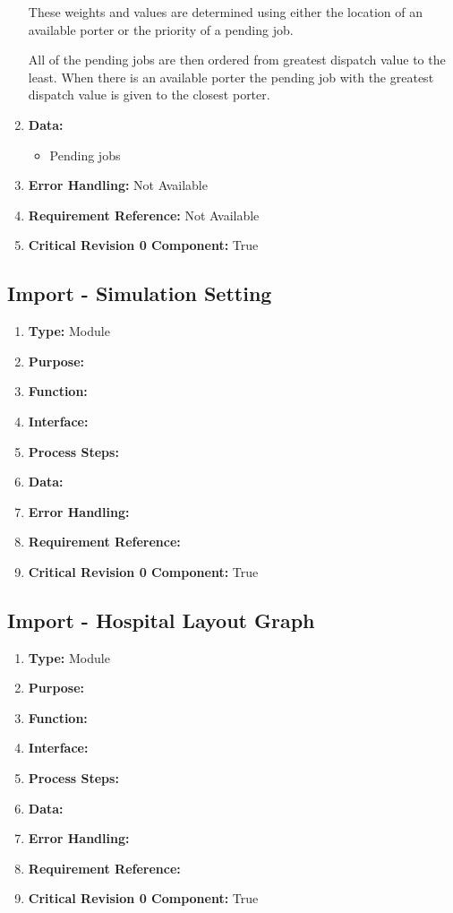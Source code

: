 \documentclass[paper=letter, fontsize=10pt]{scrartcl}
\numberwithin{equation}{section}		%
\numberwithin{figure}{section}			%
\numberwithin{table}{section}				%
\begin{document}
\begin{enumerate}[]
	These weights and values are determined using either the location of an available porter or the priority of a pending job.
	
	All of the pending jobs are then ordered from greatest dispatch value to the least.  When there is an available porter the pending job with the greatest dispatch value is given to the closest porter.
	\item \textbf{Data:}
		\begin{itemize}
			\item Pending jobs
		\end{itemize}
	\item \textbf{Error Handling:} Not Available
	\item \textbf{Requirement Reference:} Not Available
	\item \textbf{Critical Revision 0 Component:} True
\end{enumerate}
\subsection{Import - Simulation Setting}
\begin{enumerate}[]
	\item \textbf{Type:} Module
	\item \textbf{Purpose:} 
	\item \textbf{Function:} 
	\item \textbf{Interface:}
	\item \textbf{Process Steps:} 
	\item \textbf{Data:}
	\item \textbf{Error Handling:}
	\item \textbf{Requirement Reference:}
	\item \textbf{Critical Revision 0 Component:} True
\end{enumerate}
\subsection{Import - Hospital Layout Graph}
\begin{enumerate}[]
	\item \textbf{Type:} Module
	\item \textbf{Purpose:} 
	\item \textbf{Function:} 
	\item \textbf{Interface:}
	\item \textbf{Process Steps:} 
	\item \textbf{Data:}
	\item \textbf{Error Handling:}
	\item \textbf{Requirement Reference:}
	\item \textbf{Critical Revision 0 Component:} True
\end{enumerate}
\end{document}
